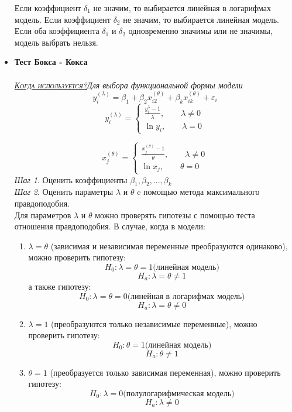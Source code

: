\documentclass[a0,final]{a0poster}
\begin{document}
\begin{multicols}{4}
\begin{itemize}
Если коэффициент ${\delta}_1$ не значим, то выбирается линейная в логарифмах модель. Если коэффициент ${\delta}_2$ не значим, то выбирается линейная модель. Если оба коэффициента ${\delta}_1$ и ${\delta}_2$ одновременно значимы или не значимы, модель выбрать нельзя.  \\
\item \textbf{Тест Бокса - Кокса}\\
\\
\underline{\textsc{\textit{Когда используется?}}}\textit{Для выбора функциональной формы модели}\\
\[y_i^{(\lambda)} = \beta_1 + \beta_2x_{i2}^{(\theta)} + \beta_kx_{ik}^{(\theta)} + \varepsilon_i\]
\[y_i^{(\lambda)} =
 \left\{
\begin{aligned}
\frac{y_i^\lambda - 1}{\lambda}, \qquad \lambda \neq 0 \\
\ln{y_i}, \qquad \lambda = 0
\end{aligned}
\right.\]

\[x^{(\theta)}_j =  \left\{ \begin{aligned}
\frac{x_j^{(\theta)} - 1}{\theta}, \qquad \lambda \neq 0 \\
\ln{x_j}, \qquad \theta = 0 \end{aligned}
\right.\]
\textit{Шаг 1}. Оценить коэффициенты $\beta_1, \beta_2, ..., \beta_k$\\
\textit{Шаг 2}. Оценить параметры $\lambda$ и $\theta$ c помощью метода максимального правдоподобия.\\
Для параметров $\lambda$ и $\theta$ можно проверять гипотезы с помощью теста отношения правдоподобия. В случае, когда в модели:
\begin{enumerate}
\item $\lambda = \theta$ (зависимая и независимая переменные преобразуются одинаково), можно проверить гипотезу:
\[H_0:\lambda = \theta =1 \text{(линейная модель)}\]
\[H_a:\lambda = \theta \neq 1\]
а также гипотезу:
\[H_0: \lambda = \theta =0 \text{(линейная в логарифмах модель)}\]
\[H_a: \lambda = \theta \neq 0\]
\item $\lambda = 1$ (преобразуются только независимые переменные), можно проверить гипотезу:
\[H_0: \theta = 1 \text{(линейная модель)}\]
\[H_a: \theta \neq 1\]
\item $\theta = 1$
(преобразуется только зависимая переменная), можно проверить гипотезу:
\[H_0: \lambda = 0 \text{(полулогарифмическая модель)}\]
\[H_a: \lambda \neq 0\]
\end{enumerate}


\end{itemize}
\end{multicols}
\end{document}
